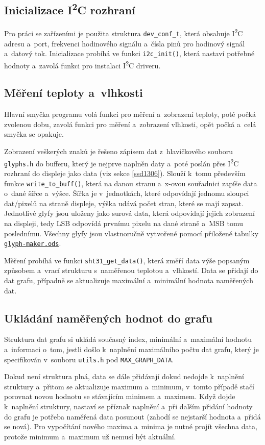 \documentclass[a4paper, 12pt]{article}
\newcommand{\iic}{I\textsuperscript{2}C }
\begin{document}
    \subsection{Inicializace \iic rozhraní}
    Pro práci se zařízeními je použita struktura \texttt{dev\_conf\_t}, která obsahuje \iic adresu a~port, frekvenci hodinového signálu a~čísla pinů pro hodinový signál a~datový tok. Inicializace probíhá ve funkci \texttt{i2c\_init()}, která nastaví potřebné hodnoty a~zavolá funkci pro instalaci \iic driveru.

    \subsection{Měření teploty a~vlhkosti}
    Hlavní smyčka programu volá funkci pro měření a~zobrazení teploty, poté počká zvolenou dobu, zavolá funkci pro měření a~zobrazení vlhkosti, opět počká a~celá smyčka se opakuje.

    Zobrazení veškerých znaků je řešeno zápisem dat z~hlavičkového souboru \texttt{glyphs.h} do bufferu, který je nejprve naplněn daty a~poté poslán přes \iic rozhraní do displeje jako data (viz sekce \ref{ssd1306}). Slouží k~tomu především funkce \texttt{write\_to\_buff()}, která na danou stranu a~x-ovou souřadnici zapíše data o~dané šířce a~výšce. Šířka je v~jednotkách, které odpovídají jednomu sloupci dat/pixelů na straně displeje, výška udává počet stran, které se mají zapsat. Jednotlivé glyfy jsou uloženy jako surová data, která odpovídají jejich zobrazení na displeji, tedy LSB odpovídá prvnímu pixelu na dané straně a~MSB tomu poslednímu. Všechny glyfy jsou vlastnoručně vytvořené pomocí přiložené tabulky \href{run:../glyph-maker.ods}{\texttt{glyph-maker.ods}}.

    Měření probíhá ve funkci \texttt{sht31\_get\_data()}, která změří data výše popsaným způsobem a~vrací strukturu s~naměřenou teplotou a~vlhkostí. Data se přidají do dat grafu, případně se aktualizuje maximální a~minimální hodnota naměřených dat.

    \subsection{Ukládání naměřených hodnot do grafu}
    Struktura dat grafu si ukládá současný index, minimální a~maximální hodnotu a~informaci o~tom, jestli došlo k~naplnění maximálního počtu dat grafu, který je specifikován v~souboru \texttt{utils.h} pod \texttt{MAX\_GRAPH\_DATA}.

    Dokud není struktura plná, data se dále přidávají dokud nedojde k~naplnění struktury a~přitom se aktualizuje maximum a~minimum, v~tomto případě stačí porovnat novou hodnotu se stávajícím minimem a~maximem. Když dojde k~naplnění struktury, nastaví se příznak naplnění a~při dalším přidání hodnoty do grafu je potřeba naměřená data posunout (zahodí se nejstarší hodnota a~přidá se nová). Pro vypočítání nového maxima a~minima je nutné projít všechna data, protože minimum a~maximum už nemusí být aktuální.
\end{document}
